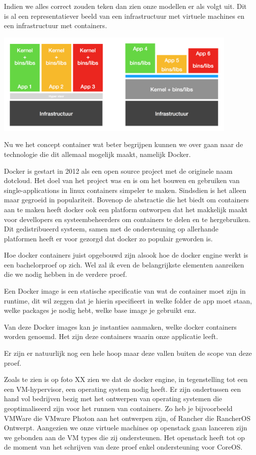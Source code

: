 Indien we alles correct zouden teken dan zien onze modellen er als volgt uit. Dit is al een representatiever beeld van een infrastructuur met virtuele machines en een infrastructuur met containers.

\includegraphics[height=5cm]{img/docker3.png}

Nu we het concept container wat beter begrijpen kunnen we over gaan naar de technologie die dit allemaal mogelijk maakt, namelijk Docker.

Docker is gestart in 2012 als een open source project met de originele naam dotcloud. Het doel van het project was en is om het bouwen en gebruiken van single-applications in linux containers simpeler te maken. Sindsdien is het alleen maar gegroeid in populariteit. Bovenop de abstractie die het biedt om containers aan te maken heeft docker ook een platform ontworpen dat het makkelijk maakt voor devellopers en systeembeheerders om containers te delen en te hergebruiken. Dit gedistribueerd systeem, samen met de ondersteuning op allerhande platformen heeft er voor gezorgd dat docker zo populair geworden is.

Hoe docker containers juist opgebouwd zijn alsook hoe de docker engine werkt is een bachelorproef op zich. Wel zal ik even de belangrijkste elementen aanreiken die we nodig hebben in de verdere proef.

Een Docker image is een statische specificatie van wat de container moet zijn in runtime, dit wil zeggen dat je hierin specifieert in welke folder de app moet staan, welke packages je nodig hebt, welke base image je gebruikt enz.

Van deze Docker images kan je instanties aanmaken, welke docker containers worden genoemd. Het zijn deze containers waarin onze applicatie leeft.

Er zijn er natuurlijk nog een hele hoop maar deze vallen buiten de scope van deze proef.

Zoals te zien is op foto XX zien we dat de docker engine, in tegenstelling tot een een VM-hypervisor, een operating system nodig heeft. 
Er zijn ondertussen een hand vol bedrijven bezig met het ontwerpen van operating systemen die geoptimaliseerd zijn voor het runnen van containers.
Zo heb je bijvoorbeeld VMWare die VMware Photon aan het ontwerpen zijn, of Rancher  die RancherOS Ontwerpt. Aangezien we onze virtuele machines op openstack gaan lanceren zijn we gebonden aan de VM types die zij ondersteunen. Het openstack heeft tot op de moment van het schrijven van deze proef enkel ondersteuning voor CoreOS. 

